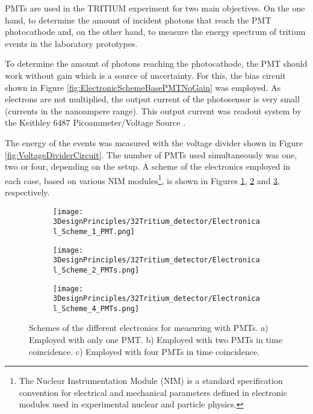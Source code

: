 PMTs are used in the TRITIUM experiment for two main objectives. On the one hand, to determine the amount of incident photons that reach the PMT photocathode and, on the other hand, to measure the energy spectrum of tritium events in the laboratory prototypes.

To determine the amount of photons reaching the photocathode, the PMT should work without gain which is a source of uncertainty. For this, the bias circuit shown in Figure \ref{fig:ElectronicSchemeBasePMTNoGain} was employed. As electrons are not multiplied, the output current of the photosensor is very small (currents in the nanoampere range). This output current was readout system by the Keithley 6487 Picoammeter/Voltage Source \cite{DataSheetKeithley6487}. 

The energy of the events was measured with the voltage divider shown in Figure \ref{fig:VoltageDividerCircuit}. The number of PMTs used simultaneously was one, two or four, depending on the setup. A scheme of the electronics employed in each case, based on various NIM modules\footnote{The Nuclear Instrumentation Module (NIM) is a standard specification convention for electrical and mechanical parameters defined in electronic modules used in experimental nuclear and particle physics.}, is shown in Figures \ref{subfig:ElectronicConfiguraiton1PMT}, \ref{subfig:ElectronicConfiguraiton2PMT} and \ref{subfig:ElectronicConfiguraiton4PMT}, respectively.

\begin{figure}
\centering
    \begin{subfigure}[b]{1.0\textwidth}
    \centering
    \texttt{[image: 3DesignPrinciples/32Tritium\_detector/Electronical\_Scheme\_1\_PMT.png]}  
    \caption{\label{subfig:ElectronicConfiguraiton1PMT}}
    \end{subfigure}
    \hfill
    \begin{subfigure}[b]{1.0\textwidth}
    \centering
    \texttt{[image: 3DesignPrinciples/32Tritium\_detector/Electronical\_Scheme\_2\_PMTs.png]}  
    \caption{\label{subfig:ElectronicConfiguraiton2PMT}}
    \end{subfigure}
    \hfill
    \begin{subfigure}[b]{1.0\textwidth}
    \centering
    \texttt{[image: 3DesignPrinciples/32Tritium\_detector/Electronical\_Scheme\_4\_PMTs.png]}  
    \caption{\label{subfig:ElectronicConfiguraiton4PMT}}
    \end{subfigure}
 \caption{Schemes of the different electronics for measuring with PMTs. a) Employed with only one PMT. b) Employed with two PMTs in time coincidence. c) Employed with four PMTs in time coincidence.}
 \label{fig:ElectronicConfiguraitonsPMT}
\end{figure}

